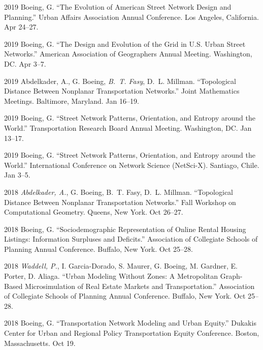 \documentclass[12pt,letterpaper]{report}
\begin{document}
	\begin{tablist}
		
		\item[2019] \tab Boeing, G. \enquote{The Evolution of American Street Network Design and Planning.} Urban Affairs Association Annual Conference. Los Angeles, California. Apr 24--27.
		
		\item[2019] \tab Boeing, G. \enquote{The Design and Evolution of the Grid in U.S. Urban Street Networks.} American Association of Geographers Annual Meeting. Washington, DC. Apr 3--7.
		
		\item[2019] \tab Abdelkader, A., G. Boeing, \textit{B.~T. Fasy}, D.~L. Millman. \enquote{Topological Distance Between Nonplanar Transportation Networks.} Joint Mathematics Meetings. Baltimore, Maryland. Jan 16--19.
		
		\item[2019] \tab Boeing, G. \enquote{Street Network Patterns, Orientation, and Entropy around the World.} Transportation Research Board Annual Meeting. Washington, DC. Jan 13--17.
		
		\item[2019] \tab Boeing, G. \enquote{Street Network Patterns, Orientation, and Entropy around the World.} International Conference on Network Science (NetSci-X). Santiago, Chile. Jan 3--5.
		
		\item[2018] \tab \textit{Abdelkader, A.}, G. Boeing, B.~T. Fasy, D.~L. Millman. \enquote{Topological Distance Between Nonplanar Transportation Networks.} Fall Workshop on Computational Geometry. Queens, New York. Oct 26--27.
		
		\item[2018] \tab Boeing, G. \enquote{Sociodemographic Representation of Online Rental Housing Listings: Information Surpluses and Deficits.} Association of Collegiate Schools of Planning Annual Conference. Buffalo, New York. Oct 25--28.
		
		\item[2018] \tab \textit{Waddell, P.}, I. Garcia-Dorado, S. Maurer, G. Boeing, M. Gardner, E. Porter, D. Aliaga. \enquote{Urban Modeling Without Zones: A Metropolitan Graph-Based Microsimulation of Real Estate Markets and Transportation.} Association of Collegiate Schools of Planning Annual Conference. Buffalo, New York. Oct 25--28.
		
		\item[2018] \tab Boeing, G. \enquote{Transportation Network Modeling and Urban Equity.} Dukakis Center for Urban and Regional Policy Transportation Equity Conference. Boston, Massachusetts. Oct 19.
		

\end{tablist}
\end{document}

